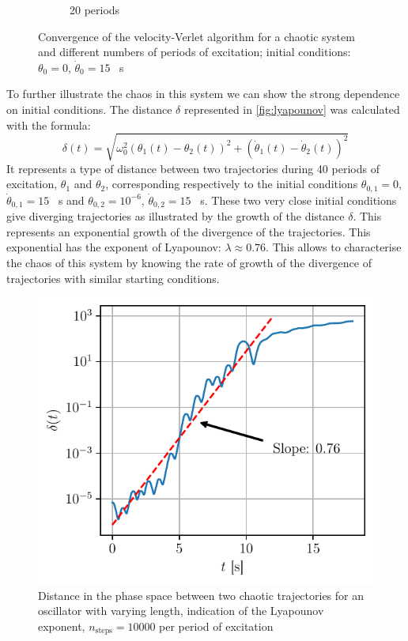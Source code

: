 \begin{figure}[h]
\begin{subfigure}{0.48\linewidth}
        \caption{20 periods}
        \label{fig:chaos_20_per}
    \end{subfigure}
    \caption{Convergence of the velocity-Verlet algorithm for a chaotic system and different numbers of periods of excitation; initial conditions: $\theta_0 = 0$, $\dot{\theta}_0 = 15$ \si{\per\second}}
\end{figure}

To further illustrate the chaos in this system we can show the strong dependence on initial conditions. The distance $\delta$ represented in \autoref{fig:lyapounov} was calculated with the formula:
\begin{equation}
    \delta(t) = \sqrt{\omega_0^2(\theta_1(t) - \theta_2(t))^2 + (\dot\theta_1(t) - \dot\theta_2(t))^2}
\end{equation}
It represents a type of distance between two trajectories during 40 periods of excitation, $\theta_1$ and $\theta_2$, corresponding respectively to the initial conditions $\theta_{0,1} = 0$, $\dot\theta_{0,1} = 15$ \si{\per\second} and $\theta_{0,2} = 10^{-6}$, $\dot\theta_{0,2} = 15$ \si{\per\second}. These two very close initial conditions give diverging trajectories as illustrated by the growth of the distance $\delta$. This represents an exponential growth of the divergence of the trajectories. This exponential has the exponent of Lyapounov: $\lambda \approx 0.76$. This allows to characterise the chaos of this system by knowing the rate of growth of the divergence of trajectories with similar starting conditions.

\begin{figure}[H]
    \centering
    \includegraphics[width=0.6\linewidth]{figures/lyapounov.pdf}
    \caption{Distance in the phase space between two chaotic trajectories for an oscillator with varying length, indication of the Lyapounov exponent, $n_\mathrm{steps} = 10000$ per period of excitation}
    \label{fig:lyapounov}
\end{figure}



